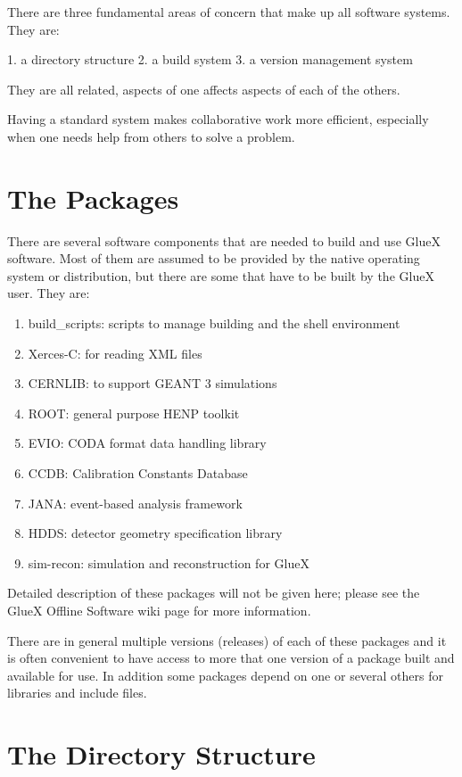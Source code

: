 There are three fundamental areas of concern that make up all software systems. They are:

1. a directory structure
2. a build system
3. a version management system

They are all related, aspects of one affects aspects of each of the others.

Having a standard system makes collaborative work more efficient, especially when one needs help from others to solve a problem.

\chapter{The Packages}

There are several software components that are needed to build and use GlueX software. Most of them are assumed to be provided by the native operating system or distribution, but there are some that have to be built by the GlueX user. They are:

\begin{enumerate}
\item build\_scripts: scripts to manage building and the shell environment
\item Xerces-C: for reading XML files
\item CERNLIB: to support GEANT 3 simulations
\item ROOT: general purpose HENP toolkit
\item EVIO: CODA format data handling library
\item CCDB: Calibration Constants Database
\item JANA: event-based analysis framework
\item HDDS: detector geometry specification library 
\item sim-recon: simulation and reconstruction for GlueX
\end{enumerate}

Detailed description of these packages will not be given here; please see the GlueX Offline Software wiki page for more information.

There are in general multiple versions (releases) of each of these packages and it is often convenient to have access to more that one version of a package built and available for use. In addition some packages depend on one or several others for libraries and include files.

\chapter{The Directory Structure}


